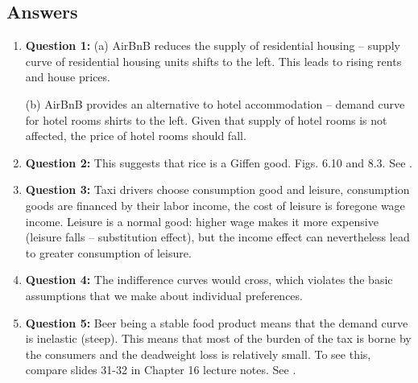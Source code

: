 \documentclass{article}
\begin{document}
\subsection*{Answers}
\begin{enumerate}
  \item \textbf{Question 1:} (a) AirBnB reduces the supply of residential housing – supply curve of residential housing units shifts to the left. This leads to rising rents and house prices.


  (b) AirBnB provides an alternative to hotel accommodation – demand curve for hotel rooms shirts to the left. Given that supply of hotel rooms is not affected, the price of hotel rooms should fall.
  \item \textbf{Question 2:} This suggests that rice is a Giffen good. Figs. 6.10 and 8.3. See \textcite{Jensen_Miller_2008}.
  \item \textbf{Question 3:} Taxi drivers choose consumption good and leisure, consumption goods are financed by their labor income, the cost of leisure is foregone wage income. Leisure is a normal good: higher wage makes it more expensive (leisure falls – substitution effect), but the income effect can nevertheless lead to greater consumption of leisure.
  \item \textbf{Question 4:} The indifference curves would cross, which violates the basic assumptions that we make about individual preferences.
  \item \textbf{Question 5:} Beer being a stable food product means that the demand curve is inelastic (steep). This means that most of the burden of the tax is borne by the consumers and the deadweight loss is relatively small. To see this, compare slides 31-32 in Chapter 16 lecture notes. See \textcite{Deconinck_Swinnen_2012}.
\end{enumerate}

\printbibliography
\end{document}
